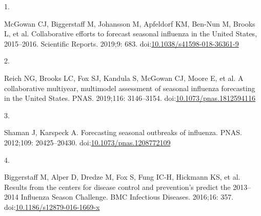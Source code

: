 \documentclass[10pt,letterpaper]{article} %
\newlength{\cslhangindent}
\newlength{\csllabelwidth}
\newlength{\cslentryspacingunit} %
\newenvironment{CSLReferences}[2] %
 {%
  \setlength{\parindent}{0pt}
  \ifodd #1
  \let\oldpar\par
  \def\par{\hangindent=\cslhangindent\oldpar}
  \fi
  \setlength{\parskip}{#2\cslentryspacingunit}
 }%
 {}
\newcommand{\CSLLeftMargin}[1]{\parbox[t]{\csllabelwidth}{#1}}
\newcommand{\CSLRightInline}[1]{\parbox[t]{\linewidth - \csllabelwidth}{#1}\break}
\providecommand{\DIFaddbegin}{} %
\providecommand{\DIFaddend}{} %
\providecommand{\DIFdelbegin}{} %
\providecommand{\DIFdelend}{} %
\newcommand{\DIFscaledelfig}{0.5}
\newlength{\DIFdelgraphicswidth} %
\newlength{\DIFdelgraphicsheight} %
\newcommand{\DIFaddincludegraphics}[2][]{{\color{blue}\fbox{\DIFOincludegraphics[#1]{#2}}}} %
\newcommand{\DIFdelincludegraphics}[2][]{%
\sbox{\DIFdelgraphicsbox}{\DIFOincludegraphics[#1]{#2}}%
\settoboxwidth{\DIFdelgraphicswidth}{\DIFdelgraphicsbox} %
\settoboxtotalheight{\DIFdelgraphicsheight}{\DIFdelgraphicsbox} %
\scalebox{\DIFscaledelfig}{%
\parbox[b]{\DIFdelgraphicswidth}{\usebox{\DIFdelgraphicsbox}\\[-\baselineskip] \rule{\DIFdelgraphicswidth}{0em}}\llap{\resizebox{\DIFdelgraphicswidth}{\DIFdelgraphicsheight}{%
\setlength{\unitlength}{\DIFdelgraphicswidth}%
\begin{picture}(1,1)%
\thicklines\linethickness{2pt} %
{\color[rgb]{1,0,0}\put(0,0){\framebox(1,1){}}}%
{\color[rgb]{1,0,0}\put(0,0){\line( 1,1){1}}}%
{\color[rgb]{1,0,0}\put(0,1){\line(1,-1){1}}}%
\end{picture}%
}\hspace*{3pt}}} %
} %
\DeclareRobustCommand{\DIFaddbegin}{\DIFOaddbegin \let\includegraphics\DIFaddincludegraphics} %
\DeclareRobustCommand{\DIFaddend}{\DIFOaddend \let\includegraphics\DIFOincludegraphics} %
\DeclareRobustCommand{\DIFdelbegin}{\DIFOdelbegin \let\includegraphics\DIFdelincludegraphics} %
\DeclareRobustCommand{\DIFdelend}{\DIFOaddend \let\includegraphics\DIFOincludegraphics} %
\begin{document}
\DIFaddend \hypertarget{refs}{}
\begin{CSLReferences}{0}{0}
\leavevmode{}%
\CSLLeftMargin{1. }
\DIFdelbegin %
\DIFdelend \DIFaddbegin \CSLRightInline{McGowan CJ, Biggerstaff M, Johansson M, Apfeldorf KM,
Ben-Nun M, Brooks L, et al. Collaborative efforts to forecast seasonal
influenza in the {United States}, 2015--2016. Scientific Reports.
2019;9: 683.
doi:\href{https://doi.org/10.1038/s41598-018-36361-9}{10.1038/s41598-018-36361-9}}
\DIFaddend 

\leavevmode{}%
\CSLLeftMargin{2. }
\DIFdelbegin %
\DIFdelend \DIFaddbegin \CSLRightInline{Reich NG, Brooks LC, Fox SJ, Kandula S, McGowan CJ,
Moore E, et al. A collaborative multiyear, multimodel assessment of
seasonal influenza forecasting in the {United States}. PNAS. 2019;116:
3146--3154.
doi:\href{https://doi.org/10.1073/pnas.1812594116}{10.1073/pnas.1812594116}}
\DIFaddend 

\leavevmode{}%
\CSLLeftMargin{3. }
\DIFdelbegin %
\DIFdelend \DIFaddbegin \CSLRightInline{Shaman J, Karspeck A. Forecasting seasonal outbreaks of
influenza. PNAS. 2012;109: 20425--20430.
doi:\href{https://doi.org/10.1073/pnas.1208772109}{10.1073/pnas.1208772109}}
\DIFaddend 

\leavevmode{}%
\CSLLeftMargin{4. }
\DIFdelbegin %
\DIFdelend \DIFaddbegin \CSLRightInline{Biggerstaff M, Alper D, Dredze M, Fox S, Fung IC-H,
Hickmann KS, et al. Results from the centers for disease control and
prevention's predict the 2013--2014 {Influenza Season Challenge}. BMC
Infectious Diseases. 2016;16: 357.
doi:\href{https://doi.org/10.1186/s12879-016-1669-x}{10.1186/s12879-016-1669-x}}
\DIFaddend 


\end{CSLReferences}
\end{document}
